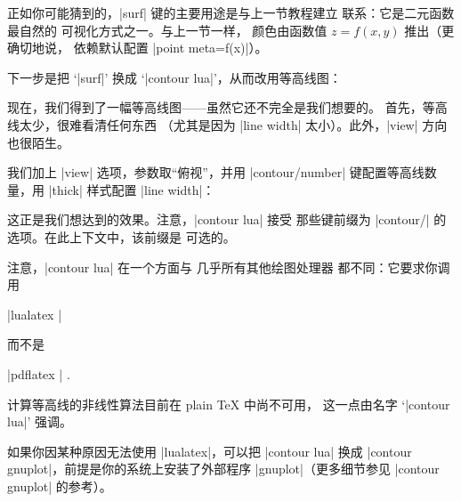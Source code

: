 正如你可能猜到的，|surf| 键的主要用途是与上一节教程建立
联系：它是二元函数最自然的
可视化方式之一。与上一节一样，
颜色由函数值 $z=f(x,y)$ 推出（更确切地说，
依赖默认配置 |point meta=f(x)|）。

下一步是把 `|surf|' 换成 `|contour lua|'，从而改用等高线图：

\pgfplotsexpensiveexample
\begin{codeexample}[]
\end{codeexample}
%
现在，我们得到了一幅等高线图——虽然它还不完全是我们想要的。
首先，等高线太少，很难看清任何东西
（尤其是因为 |line width| 太小）。此外，|view|
方向也很陌生。

我们加上 |view| 选项，参数取“俯视”，并用
|contour/number| 键配置等高线数量，用 |thick|
样式配置 |line width|：

\pgfplotsexpensiveexample
\begin{codeexample}[]
\end{codeexample}

这正是我们想达到的效果。注意，|contour lua| 接受
那些键前缀为 |contour/| 的选项。在此上下文中，该前缀是
可选的。

注意，|contour lua| 在一个方面与 \PGFPlots{} 几乎所有其他绘图处理器
都不同：它要求你调用

|lualatex |

\noindent 而不是

|pdflatex | .

\noindent
计算等高线的非线性算法目前在 plain \TeX{} 中尚不可用，
这一点由名字 `|contour lua|' 强调。


如果你因某种原因无法使用 |lualatex|，可以把 |contour lua| 换成 |contour gnuplot|，前提是你的系统上安装了外部程序 |gnuplot|（更多细节参见 |contour gnuplot| 的参考）。

